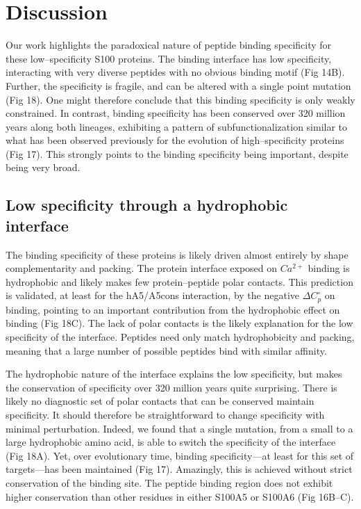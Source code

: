 \section{Discussion}

Our work highlights the paradoxical nature of peptide binding specificity
for these low--specificity S100 proteins. The binding interface has
low specificity, interacting with very diverse peptides with no obvious
binding motif (Fig 14B). Further, the specificity is fragile, and can
be altered with a single point mutation (Fig 18). One might therefore
conclude that this binding specificity is only weakly constrained.
In contrast, binding specificity has been conserved over 320 million
years along both lineages, exhibiting a pattern of subfunctionalization
similar to what has been observed previously for the evolution of
high--specificity proteins (Fig 17). This strongly points to the binding
specificity being important, despite being very broad. 

\subsection{Low specificity through a hydrophobic interface}

The binding specificity of these proteins is likely driven almost
entirely by shape complementarity and packing. The protein interface
exposed on $Ca^{2+}$ binding is hydrophobic and likely makes few
protein--peptide polar contacts. This prediction is validated, at least
for the hA5/A5cons interaction, by the negative $\Delta C_{p}^{\circ}$
on binding, pointing to an important contribution from the hydrophobic
effect on binding (Fig 18C). The lack of polar contacts is the likely
explanation for the low specificity of the interface. Peptides need
only match hydrophobicity and packing, meaning that a large number
of possible peptides bind with similar affinity.

The hydrophobic nature of the interface explains the low specificity,
but makes the conservation of specificity over 320 million years quite
surprising. There is likely no diagnostic set of polar contacts that
can be conserved maintain specificity. It should therefore be straightforward
to change specificity with minimal perturbation. Indeed, we found
that a single mutation, from a small to a large hydrophobic amino
acid, is able to switch the specificity of the interface (Fig 18A).
Yet, over evolutionary time, binding specificity---at least for this
set of targets---has been maintained (Fig 17). Amazingly, this is achieved
without strict conservation of the binding site. The peptide binding
region does not exhibit higher conservation than other residues in
either S100A5 or S100A6 (Fig 16B--C). 

